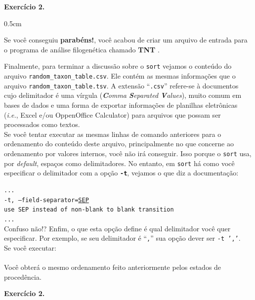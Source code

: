\begin{refsection}
\begin{blackBlock}{\textbf{Exercício 2.}}
\begin {myindentpar}{0.5cm}
\begin{enumerate}[\itshape i.]
Se você conseguiu \textbf{parabéns!}, você acabou de criar um arquivo de entrada para o programa de análise filogenética chamado \textbf{TNT} \parencite{GoloboffEtAl_2008}.
	
\end{enumerate}
\end{myindentpar}
\end{blackBlock}


Finalmente, para terminar a discussão sobre o \texttt{sort} vejamos o conteúdo do arquivo \texttt{random\_taxon\_table.csv}. Ele contém as mesmas informações que o arquivo \texttt{random\_taxon\_table.tsv}. A extensão ``\texttt{.csv}'' refere-se à documentos cujo delimitador é uma vírgula (\textit{\textbf{C}omma \textbf{S}eparated \textbf{V}alues}), muito comum em bases de dados e uma forma de exportar informações de planilhas eletrônicas (\textit{i.e.}, Excel e/ou OppenOffice Calculator) para arquivos que possam ser processados como textos.\\

Se você tentar executar as mesmas linhas de comando anteriores para o ordenamento do conteúdo deste arquivo, principalmente no que concerne ao ordenamento por valores internos, você não irá conseguir. Isso porque o \texttt{sort} usa, por \textit{default}, espaços como delimitadores. No entanto, em \texttt{sort} há como você especificar o delimitador com a opção \texttt{\textbf{-t}}, vejamos o que diz a documentação:


\texttt{...}\\
\texttt{-t, --field-separator=\underline{SEP}}\\
\indent\texttt{use SEP instead of non-blank to blank transition}\\
\texttt{...}\\

Confuso não!? Enfim, o que esta opção define é qual delimitador você quer especificar. Por exemplo, se seu delimitador é ``\texttt{,}'' sua opção dever ser \texttt{-t ','}.\\

Se você executar:\\
\\

Você obterá o mesmo ordenamento feito anteriormente pelos estados de procedência.\\

\begin{blackBlock}{\textbf{Exercício 2.}}\label{tut2:ex:2.\arabic{ex}}


\end{blackBlock}
\end{refsection}
